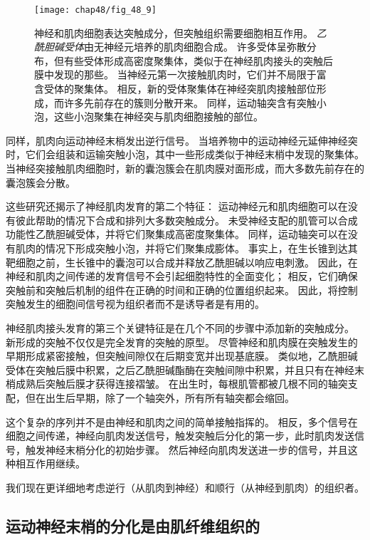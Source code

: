 \begin{figure}[htbp]
	\centering
	\texttt{[image: chap48/fig\_48\_9]}
	\caption{神经和肌肉细胞表达突触成分，但突触组织需要细胞相互作用。
		\textit{乙酰胆碱受体}由无神经元培养的肌肉细胞合成。
		许多受体呈弥散分布，但有些受体形成高密度聚集体，类似于在神经肌肉接头的突触后膜中发现的那些。
		当神经元第一次接触肌肉时，它们并不局限于富含受体的聚集体。
		相反，新的受体聚集体在神经突肌肉接触部位形成，而许多先前存在的簇则分散开来。
		同样，运动轴突含有突触小泡，这些小泡聚集在神经突与肌肉细胞接触的部位\cite{anderson1977nerve,lupa1990specific}。}
	\label{fig:48_9}
\end{figure}


同样，肌肉向运动神经末梢发出逆行信号。
当培养物中的运动神经元延伸神经突时，它们会组装和运输突触小泡，其中一些形成类似于神经末梢中发现的聚集体。
当神经突接触肌肉细胞时，新的囊泡簇会在肌肉膜对面形成，而大多数先前存在的囊泡簇会分散。


这些研究还揭示了神经肌肉发育的第二个特征：
运动神经元和肌肉细胞可以在没有彼此帮助的情况下合成和排列大多数突触成分。
未受神经支配的肌管可以合成功能性乙酰胆碱受体，并将它们聚集成高密度聚集体。
同样，运动轴突可以在没有肌肉的情况下形成突触小泡，并将它们聚集成膨体。
事实上，在生长锥到达其靶细胞之前，生长锥中的囊泡可以合成并释放乙酰胆碱以响应电刺激。
因此，在神经和肌肉之间传递的发育信号不会引起细胞特性的全面变化；
相反，它们确保突触前和突触后机制的组件在正确的时间和正确的位置组织起来。
因此，将控制突触发生的细胞间信号视为组织者而不是诱导者是有用的。


神经肌肉接头发育的第三个关键特征是在几个不同的步骤中添加新的突触成分。
新形成的突触不仅仅是完全发育的突触的原型。
尽管神经和肌肉膜在突触发生的早期形成紧密接触，但突触间隙仅在后期变宽并出现基底膜。
类似地，乙酰胆碱受体在突触后膜中积累，之后乙酰胆碱酯酶在突触间隙中积累，并且只有在神经末梢成熟后突触后膜才获得连接褶皱。
在出生时，每根肌管都被几根不同的轴突支配，但在出生后早期，除了一个轴突外，所有所有轴突都会缩回。


这个复杂的序列并不是由神经和肌肉之间的简单接触指挥的。 
相反，多个信号在细胞之间传递，神经向肌肉发送信号，触发突触后分化的第一步，此时肌肉发送信号，触发神经末梢分化的初始步骤。
然后神经向肌肉发送进一步的信号，并且这种相互作用继续。


我们现在更详细地考虑逆行（从肌肉到神经）和顺行（从神经到肌肉）的组织者。



\subsection{运动神经末梢的分化是由肌纤维组织的}


